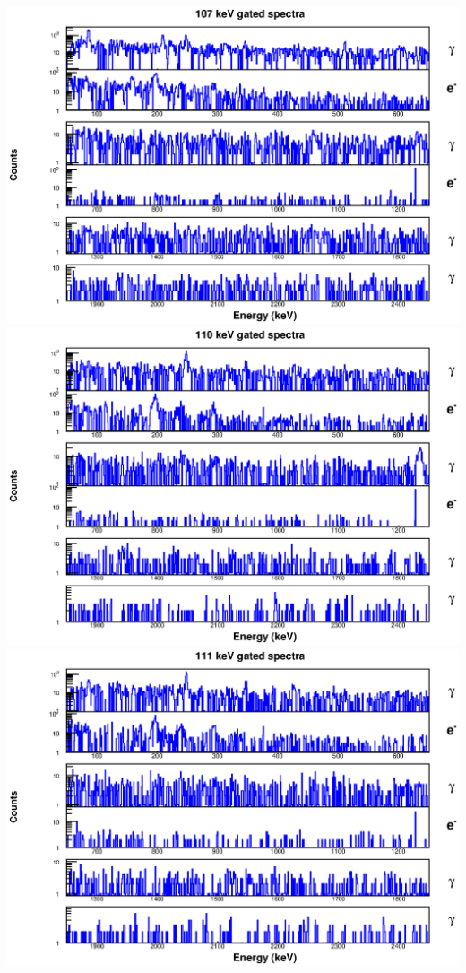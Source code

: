 \includegraphics[scale=0.8]{154Gd_Appendix/107_combined.eps}
\includegraphics[scale=0.8]{154Gd_Appendix/110_combined.eps}
\includegraphics[scale=0.8]{154Gd_Appendix/111_combined.eps}
